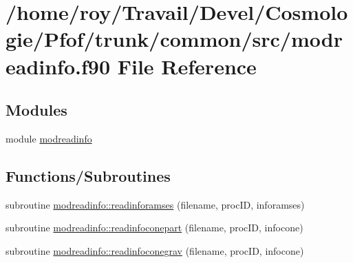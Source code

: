 \hypertarget{modreadinfo_8f90}{}\section{/home/roy/\+Travail/\+Devel/\+Cosmologie/\+Pfof/trunk/common/src/modreadinfo.f90 File Reference}
\label{modreadinfo_8f90}
\subsection*{Modules}
\begin{DoxyCompactItemize}
\item 
module \hyperlink{namespacemodreadinfo}{modreadinfo}
\end{DoxyCompactItemize}
\subsection*{Functions/\+Subroutines}
\begin{DoxyCompactItemize}
\item 
subroutine \hyperlink{namespacemodreadinfo_ad4ce83722d25f51b80d1e8489d9696fe}{modreadinfo\+::readinforamses} (filename, proc\+ID, inforamses)
\item 
subroutine \hyperlink{namespacemodreadinfo_a2c0303b5ec9e2f3992e012a36d035c64}{modreadinfo\+::readinfoconepart} (filename, proc\+ID, infocone)
\item 
subroutine \hyperlink{namespacemodreadinfo_a5892e0554b8fedb2f0c99132484b82d4}{modreadinfo\+::readinfoconegrav} (filename, proc\+ID, infocone)
\end{DoxyCompactItemize}
